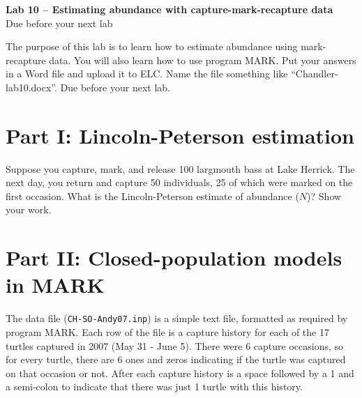 \documentclass[12pt]{article}
\begin{document}
{
  \Large
  \centering
  {\bf Lab 10 -- Estimating abundance with
    capture-mark-recapture data} \\
  Due before your next lab \par
}

\vspace{10pt}


The purpose of this lab is to learn how to %
estimate abundance using mark-recapture data. You will also learn how
to use program MARK. Put your answers in a Word file and upload it to
ELC. Name the file something like ``Chandler-lab10.docx''. Due before
your next lab.





\section*{\large Part I: Lincoln-Peterson estimation}
Suppose you capture, mark, and release 100 largmouth bass at Lake
Herrick. The next day, you return and capture 50 individuals, 25 of
which were marked on the first occasion. What is the Lincoln-Peterson
estimate of abundance ($N$)? Show your work.





\section*{\large  Part II: Closed-population models in MARK}
The data file (\verb+CH-SO-Andy07.inp+) is a simple text file, formatted
as required by program MARK. Each row of the file is a capture history
for each of the 17 turtles captured in 2007 (May 31 - June 5). There
were 6 capture occasions, so for every turtle, there are 6 ones and
zeros indicating if the turtle was captured on that occasion or
not. After each capture history is a space followed by a 1 and a
semi-colon to indicate that there was just 1 turtle with this history.
\end{document}

